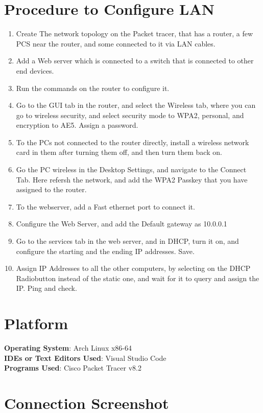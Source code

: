 \documentclass[11pt]{article}
\begin{document}
\section{Procedure to Configure LAN}
\begin{enumerate}
	\item Create The network topology on the Packet tracer, that has a router, a few PCS near the router, and some connected to it via LAN cables. 
	\item Add a Web server which is connected to a switch that is connected to other end devices. 
	\item Run the commands on the router to configure it. 
	\item Go to the GUI tab in the router, and select the Wireless tab, where you can go to wireless security, and select security mode to WPA2, personal, and encryption to AE5. Assign a password. 
	\item To the PCs not connected to the router directly, install a wireless network card in them after turning them off, and then turn them back on. 
	\item Go the PC wireless in the Desktop Settings, and navigate to the Connect Tab. Here refersh the network, and add the WPA2 Passkey that you have assigned to the router. 
	\item To the webserver, add a Fast ethernet port to connect it. 
	\item Configure the Web Server, and add the Default gateway as 10.0.0.1
	\item Go to the services tab in the web server, and in DHCP, turn it on, and configure the starting and the ending IP addresses. Save. 
	\item Assign IP Addresses to all the other computers, by selecting on the DHCP Radiobutton instead of the static one, and wait for it to query and assign the IP. Ping and check. 
\end{enumerate}

\section{Platform}
	\textbf{Operating System}: Arch Linux x86-64\\
	\textbf{IDEs or Text Editors Used}: Visual Studio Code\\
	\textbf{Programs Used}: Cisco Packet Tracer v8.2

\section{Connection Screenshot}
\end{document}
